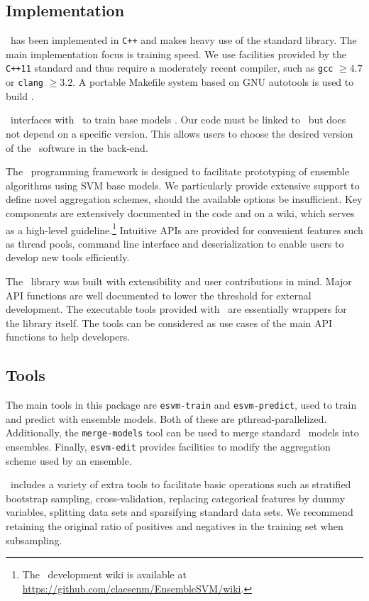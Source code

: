 \subsection{Implementation}
\esvm\ has been implemented in \texttt{C++} and makes heavy use of the standard library. The main implementation focus is training speed. We use facilities provided by the \texttt{C++11} standard and thus require a moderately recent compiler, such as \texttt{gcc} $\geq4.7$ or \texttt{clang} $\geq 3.2$. A portable Makefile system based on GNU autotools is used to build \esvm. 

\esvm\ interfaces with \libsvm\ to train base models \citep{CC01a}. Our code must be linked to \libsvm\ but does not depend on a specific version. This allows users to choose the desired version of the \libsvm\ software in the back-end. 

The \esvm\ programming framework is designed to facilitate prototyping of ensemble algorithms using SVM base models.
We particularly provide extensive support to define novel aggregation schemes, should the available options be insufficient. 
Key components are extensively documented in the code and on a wiki, which serves as a high-level guideline.\footnote{The \esvm\ development wiki is available at \url{https://github.com/claesenm/EnsembleSVM/wiki}.} Intuitive APIs are provided for convenient features such as thread pools, command line interface and deserialization to enable users to develop new tools efficiently.

\newpage
{\noindent}The \esvm\ library was built with extensibility and user
contributions in mind.
Major API functions are well documented to lower the threshold
for external development. The executable tools provided with \esvm\ are
essentially wrappers for the library itself. The tools can be considered as use
cases of the main API functions to help developers.

\subsection{Tools}
The main tools in this package are {\tt esvm-train} and {\tt esvm-predict}, used
to train and predict with ensemble models. Both of these are pthread-parallelized. 
Additionally, the {\tt merge-models} tool can be used to merge standard \libsvm\ models into ensembles. 
Finally, {\tt esvm-edit} provides facilities to modify the aggregation scheme used by an ensemble.

\esvm\ includes a variety of extra tools to facilitate basic operations such as
stratified bootstrap sampling, cross-validation, replacing categorical features
by dummy variables, splitting data sets and sparsifying standard data sets. We recommend retaining the original ratio of positives and negatives in the training set when subsampling.

